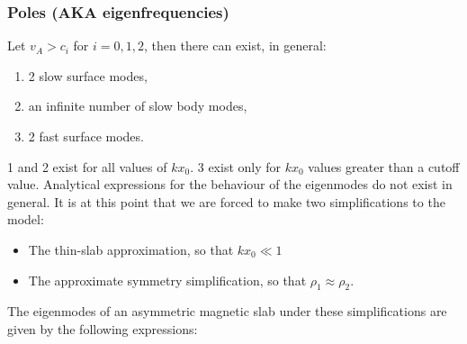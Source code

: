 \documentclass[12pt]{article}
\begin{document}
\subsubsection{Poles (AKA eigenfrequencies)}
Let $v_A > c_i$ for $i = 0, 1, 2$, then there can exist, in general:
\begin{enumerate}
	\item 2 slow surface modes,
	\item an infinite number of slow body modes,
	\item 2 fast surface modes.
\end{enumerate}
1 and 2 exist for all values of $kx_0$. 3 exist only for $kx_0$ values greater than a cutoff value. Analytical expressions for the behaviour of the eigenmodes do not exist in general. It is at this point that we are forced to make two simplifications to the model:
\begin{itemize}
	\item The thin-slab approximation, so that $kx_0 \ll 1$
	\item The approximate symmetry simplification, so that $\rho_1 \approx \rho_2$.
\end{itemize}
The eigenmodes of an asymmetric magnetic slab under these simplifications are given by the following expressions:
\end{document}
